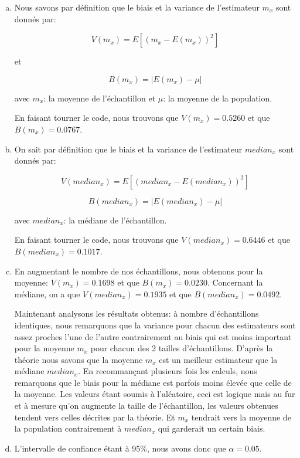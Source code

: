 \documentclass[11pt]{report}
\begin{document}
\begin{enumerate}[(a)]

\item Nous savons par définition que le biais et la variance de l'estimateur $m_x$ sont donnés par:

\[ V(m_x) = E\left[(m_x - E(m_x))^2\right] \]

et

\[ B(m_x) = |E(m_x) - \mu| \]

avec $m_x$: la moyenne de l'échantillon et $\mu$: la moyenne de la population.

En faisant tourner le code, nous trouvons que $V(m_x) = 0.5260$ et que $B(m_x) = 0.0767$.

\item On sait par définition que le biais et la variance de l'estimateur $median_x$ sont donnés par:

\[ V(median_x) = E\left[(median_x - E(median_x))^2\right] \]

\[ B(median_x) = |E(median_x) - \mu| \]

avec $median_x$: la médiane de l'échantillon.

En faisant tourner le code, nous trouvons que $V(median_x) = 0.6446$ et que $B(median_x) = 0.1017$.

\item En augmentant le nombre de nos échantillons, nous obtenons pour la moyenne: $V(m_x) = 0.1698$ et que $B(m_x) = 0.0230$. Concernant la médiane, on a que $V(median_x) = 0.1935$ et que $B(median_x) = 0.0492$.

Maintenant analysons les résultats obtenus: à nombre d'échantillons identiques, nous remarquons que la variance pour chacun des estimateurs sont assez proches l'une de l'autre contrairement au biais qui est moins important pour la moyenne $m_x$ pour chacun des 2 tailles d'échantillons. D'après la théorie nous savons que la moyenne $m_x$ est un meilleur estimateur que la médiane $median_x$. En recommançant plusieurs fois les calculs, nous remarquons que le biais pour la médiane est parfois moins élevée que celle de la moyenne. Les valeurs étant soumis à l'aléatoire, ceci est logique mais au fur et à mesure qu'on augmente la taille de l'échantillon, les valeurs obtenues tendent vers celles décrites par la théorie. Et $m_x$ tendrait vers la moyenne de la population contrairement à $median_x$ qui garderait un certain biais.

\item 

L'intervalle de confiance étant à 95\%, nous avons donc que $\alpha=0.05$.


\end{enumerate}
\end{document}

